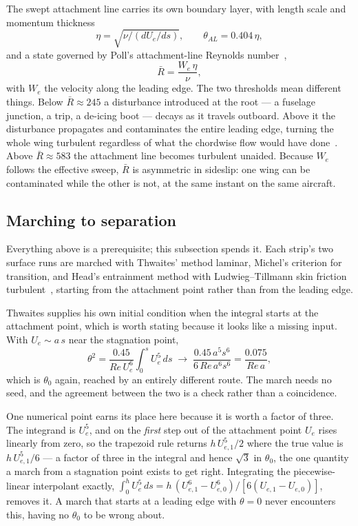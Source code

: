 \documentclass[submit]{aiaa-tc}%
\newcommand{\Rbar}{\bar{R}}
\begin{document}
The swept attachment line carries its own boundary layer, with length
scale and momentum thickness
%
\begin{equation}
  \eta = \sqrt{\nu \big/ (dU_e/ds)}, \qquad \theta_{AL} = 0.404\,\eta ,
\end{equation}
%
and a state governed by Poll's attachment-line Reynolds
number~\cite{poll1979},
%
\begin{equation}
  \Rbar = \frac{W_e\,\eta}{\nu} ,
\end{equation}
%
with $W_e$ the velocity along the leading edge. The two thresholds mean
different things. Below $\Rbar \approx 245$ a disturbance introduced at
the root --- a fuselage junction, a trip, a de-icing boot --- decays as it
travels outboard. Above it the disturbance propagates and contaminates the
entire leading edge, turning the whole wing turbulent regardless of what
the chordwise flow would have done~\cite{pfenninger1965,gaster1967}. Above
$\Rbar \approx 583$ the attachment line becomes turbulent unaided. Because
$W_e$ follows the effective sweep, $\Rbar$ is asymmetric in sideslip: one
wing can be contaminated while the other is not, at the same instant on
the same aircraft.

\subsection{Marching to separation}
\label{sec:separation}

Everything above is a prerequisite; this subsection spends it. Each
strip's two surface runs are marched with Thwaites' method laminar,
Michel's criterion for transition, and Head's entrainment method with
Ludwieg--Tillmann skin friction turbulent~\cite{cebeciCousteix2005},
starting from the attachment point rather than from the leading edge.

Thwaites supplies his own initial condition when the integral starts at
the attachment point, which is worth stating because it looks like a
missing input. With $U_e \sim a\,s$ near the stagnation point,
%
\begin{equation}
  \label{eq:thwaites-start}
  \theta^2 = \frac{0.45}{Re\,U_e^6}\int_0^s U_e^5\,ds
    \;\longrightarrow\;
    \frac{0.45\,a^5 s^6}{6\,Re\,a^6 s^6} = \frac{0.075}{Re\,a} ,
\end{equation}
%
which is $\theta_0$ again, reached by an entirely different route. The
march needs no seed, and the agreement between the two is a check rather
than a coincidence.

One numerical point earns its place here because it is worth a factor of
three. The integrand is $U_e^5$, and on the \emph{first} step out of the
attachment point $U_e$ rises linearly from zero, so the trapezoid rule
returns $h\,U_{e,1}^5/2$ where the true value is $h\,U_{e,1}^5/6$ --- a
factor of three in the integral and hence $\sqrt{3}$ in $\theta_0$, the
one quantity a march from a stagnation point exists to get right.
Integrating the piecewise-linear interpolant exactly,
$\int_0^h U_e^5\,ds = h\,(U_{e,1}^6 - U_{e,0}^6)/[6(U_{e,1} - U_{e,0})]$,
removes it. A march that starts at a leading edge with $\theta = 0$ never
encounters this, having no $\theta_0$ to be wrong about.
\end{document}
